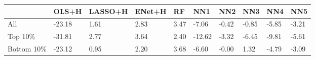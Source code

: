\begin{tabularx}{\linewidth}{*{10}{X}}
\hline
& OLS+H& LASSO+H& ENet+H& RF& NN1& NN2& NN3& NN4& NN5\\
\hline
All& -23.18& 1.61& 2.83& 3.47& -7.06& -0.42& -0.85& -5.85& -3.21\\
\hline
Top 10\%& -31.81& 2.77& 3.64& 2.40& -12.62& -3.32& -6.45& -9.81& -5.61\\
\hline
Bottom 10\%& -23.12& 0.95& 2.20& 3.68& -6.60& -0.00& 1.32& -4.79& -3.09\\
\hline
\end{tabularx}
